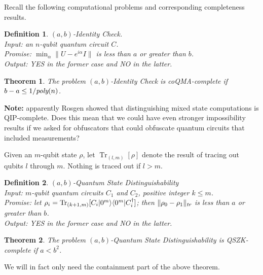 \documentclass[11pt]{article}
\DeclareMathOperator{\tr}{Tr}
\numberwithin{equation}{section}
\newtheorem{theorem}{Theorem}
\newtheorem{definition}{Definition}
\begin{document}
Recall the following computational problems and corresponding completeness results.

\begin{definition} \emph{$(a, b)$-Identity Check.}\\
\indent Input: an $n$-qubit quantum circuit $C$. \\
\indent Promise: $\min_\alpha \| U - e^{i \alpha} I \|$ is less than $a$ or greater than $b$.\\
\indent Output: YES in the former case and NO in the latter.
\end{definition}
\begin{theorem} 
The problem $(a, b)$-Identity Check is coQMA-complete if $b - a \leq 1/\emph{poly}(n)$. 
\end{theorem}
\noindent \textbf{Note:} apparently Rosgen showed that distinguishing mixed state computations is QIP-complete. Does this mean that we could have even stronger impossibility results if we asked for obfuscators that could obfuscate quantum circuits that included measurements?

Given an $m$-qubit state $\rho$, let $\tr_{(l, m)}[\rho]$ denote the result of tracing out qubits $l$ through $m$. Nothing is traced out if $l > m$.

\begin{definition} \emph{$(a, b)$-Quantum State Distinguishability}\\
\indent Input: $m$-qubit quantum circuits $C_1$ and $C_2$, positive integer $k \leq m$.\\
\indent Promise: let $\rho_i = \tr_{(k+1, m)}[C_i\ket{0^m}\bra{0^m}C_i^\dagger]$; then $\|\rho_0 - \rho_1\|_\emph{tr}$ is less than $a$ or greater than $b$.\\
\indent Output: YES in the former case and NO in the latter.
\end{definition}

\begin{theorem}
The problem $(a, b)$-Quantum State Distinguishability is QSZK-complete if $a < b^2$.
\end{theorem}

We will in fact only need the containment part of the above theorem.
\end{document}

